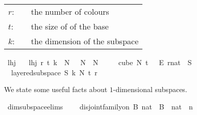 \begin{isabellebody}
\begin{isamarkuptext}
\begin{tabular}{llp{8cm}}
$r$:& \isa{nat}& the number of colours\\
$t$:& \isa{nat}& the size of of the base\\
$k$:& \isa{nat}& the dimension of the subspace
\end{tabular}%
\end{isamarkuptext}\isamarkuptrue%
\isamarkupfalse%
\ lhj\isanewline
\ \ \ {\isachardoublequoteopen}lhj\ r\ t\ k\ {\isasymequiv}\ {\isacharparenleft}{\kern0pt}{\isasymexists}N\ {\isachargreater}{\kern0pt}\ {}{\isachardot}{\kern0pt}\ {\isasymforall}N{\isacharprime}{\kern0pt}\ {\isasymge}\ N{\isachardot}{\kern0pt}\ {\isasymforall}{\isasymchi}{\isachardot}{\kern0pt}\ {\isasymchi}\ {\isasymin}\isanewline
\ \ {\isacharparenleft}{\kern0pt}cube\ N{\isacharprime}{\kern0pt}\ {\isacharparenleft}{\kern0pt}t\ {\isacharplus}{\kern0pt}\ {}{\isacharparenright}{\kern0pt}{\isacharparenright}{\kern0pt}\ {\isasymrightarrow}\isactrlsub E\ {\isacharbraceleft}{\kern0pt}{\isachardot}{\kern0pt}{\isachardot}{\kern0pt}{\isacharless}{\kern0pt}r{\isacharcolon}{\kern0pt}{\isacharcolon}{\kern0pt}nat{\isacharbraceright}{\kern0pt}\ {\isasymlongrightarrow}\ {\isacharparenleft}{\kern0pt}{\isasymexists}S{\isachardot}{\kern0pt}\isanewline
\ \ layered{\isacharunderscore}{\kern0pt}subspace\ S\ k\ N{\isacharprime}{\kern0pt}\ t\ r\ {\isasymchi}{\isacharparenright}{\kern0pt}{\isacharparenright}{\kern0pt}{\isachardoublequoteclose}%
\begin{isamarkuptext}%
We state some useful facts about $1$-dimensional subspaces.%
\end{isamarkuptext}\isamarkuptrue%
\isamarkupfalse%
\ dim{}{\isacharunderscore}{\kern0pt}subspace{\isacharunderscore}{\kern0pt}elims{\isacharcolon}{\kern0pt}\ \isanewline
\ \ \ {\isachardoublequoteopen}disjoint{\isacharunderscore}{\kern0pt}family{\isacharunderscore}{\kern0pt}on\ B\ {\isacharbraceleft}{\kern0pt}{\isachardot}{\kern0pt}{\isachardot}{\kern0pt}{}{\isacharcolon}{\kern0pt}{\isacharcolon}{\kern0pt}nat{\isacharbraceright}{\kern0pt}{\isachardoublequoteclose}\ \ {\isachardoublequoteopen}{\isasymUnion}{\isacharparenleft}{\kern0pt}B\ {\isacharbackquote}{\kern0pt}\ {\isacharbraceleft}{\kern0pt}{\isachardot}{\kern0pt}{\isachardot}{\kern0pt}{}{\isacharcolon}{\kern0pt}{\isacharcolon}{\kern0pt}nat{\isacharbraceright}{\kern0pt}{\isacharparenright}{\kern0pt}\ {\isacharequal}{\kern0pt}\ {\isacharbraceleft}{\kern0pt}{\isachardot}{\kern0pt}{\isachardot}{\kern0pt}{\isacharless}{\kern0pt}n{\isacharbraceright}{\kern0pt}{\isachardoublequoteclose}\ \ {\isachardoublequoteopen}{\isacharparenleft}{\kern0pt}{\isacharbraceleft}{\kern0pt}{\isacharbraceright}{\kern0pt}\isanewline

\end{isabellebody}
